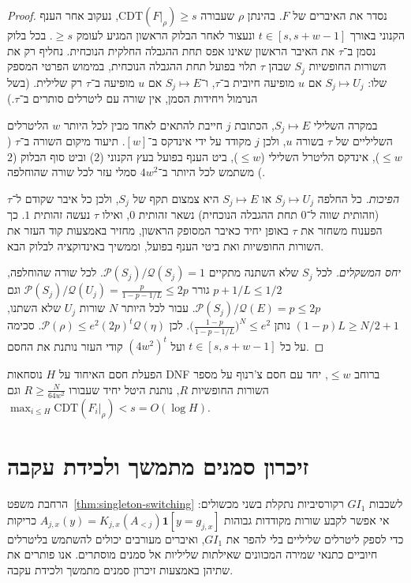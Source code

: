 \documentclass[11pt,a4paper]{article}
\theoremstyle{definition}
\theoremstyle{remark}
\newcommand{\CDT}{\mathrm{CDT}}
\newcommand{\GI}{GI_1}
\newcommand{\EN}[1]{\textenglish{#1}}
\begin{document}
\begin{proof}
נסדר את האיברים של $F$. בהינתן $\rho$ שעבורה $\CDT(F|_\rho) \ge s$, נעקוב אחר הענף הקנוני באורך $t \in [s, s+w-1]$ ונעצור לאחר הבלוק הראשון המגיע לעומק $\ge s$. בכל בלוק נסמן ב־$\tau$ את האיבר הראשון שאינו אפס תחת ההגבלה החלקית הנוכחית. נחליף רק את השורות החופשיות $S_j$ שבהן $\tau$ תלוי בפועל תחת ההגבלה הנוכחית, במימוש הפרטי המספק שלו: $S_j \mapsto U_j$ אם $u$ מופיעה חיובית ב־$\tau$, ו־$S_j \mapsto E$ אם $u$ מופיעה ב־$\tau$ רק שלילית. (בשל הנרמול ויחידות הסמן, אין שורה עם ליטרלים סותרים ב־$\tau$.)

במקרה השלילי $S_j \mapsto E$, הכתובת $j$ חייבת להתאים לאחד מבין לכל היותר $w$ הליטרלים השליליים של $\tau$ בשורה $u$, ולכן $j$ מקודד על ידי אינדקס ב־$[w]$. תיעוד מיקום השורה ב־$\tau$ ($\le w$), אינדקס הליטרל השלילי ($\le w$), ביט הענף בפועל בעץ הקנוני ($2$) וביט סוף הבלוק ($2$) משתמש לכל היותר ב־$4w^2$ סמלי עזר לכל שורה שהוחלפה.

\emph{הפיכות.} כל החלפה $S_j \mapsto U_j$ או $S_j \mapsto E$ היא צמצום תקף של $S_j$, ולכן כל איבר שקודם ל־$\tau$ (וזהותית שווה ל־$0$ תחת ההגבלה הנוכחית) נשאר זהותית $0$, ואילו $\tau$ נעשה זהותית $1$. כך הפענוח משחזר את $\tau$ באופן יחיד כאיבר המסופק הראשון, מחזיר באמצעות קוד העזר את השורות החופשיות ואת ביטי הענף בפועל, וממשיך באינדוקציה לבלוק הבא.

\emph{יחס המשקלים.} לכל $S_j$ שלא השתנה מתקיים $\mathcal{P}(S_j)/\mathcal{Q}(S_j) = 1$. לכל שורה שהוחלפה, $p + 1/L \le 1/2$ גורר $\mathcal{P}(S_j)/\mathcal{Q}(U_j) = \frac{p}{1 - p - 1/L} \le 2p$ וגם $\mathcal{P}(S_j)/\mathcal{Q}(E) = p \le 2p$. עבור לכל היותר $N$ שורות $U_j$ שלא השתנו, $(1-p)L \ge N/2 + 1$ נותן $\bigl(\frac{1-p}{1-p-1/L}\bigr)^N \le e^2$. לכן $\mathcal{P}(\rho) \le e^2 (2p)^t \mathcal{Q}(\eta)$. סכימה על כל $t \in [s, s+w-1]$ ועל $(4w^2)^t$ קודי העזר נותנת את החסם.
\end{proof}

הפעלת חסם האיחוד על $H$ נוסחאות \EN{DNF} ברוחב $\le w$, יחד עם חסם צ'רנוף על מספר השורות החופשיות $R$, נותנת היטל יחיד שעבורו $R \ge \frac{N}{64w^2}$ וגם $\max_{i \le H} \CDT(F_i|_\rho) < s = O(\log H)$.

\section{זיכרון סמנים מתמשך ולכידת עקבה}

הרחבת משפט~\ref{thm:singleton-switching} לשכבות $\GI$ רקורסיביות נתקלת בשני מכשולים: אי אפשר לקבע שורות מקודדות גבוהות $A_{j,x}(y) = K_{j,x}(A_{<j})\mathbf{1}[y = g_{j,x}]$ כריקות כדי לספק ליטרלים שליליים בלי להפר את $\GI$, ואיברים מעורבים יכולים להשתמש בליטרלים חיוביים כתנאי שמירה המכוונים שאילתות שליליות אל סמנים מוסתרים. אנו פותרים את שתיהן באמצעות זיכרון סמנים מתמשך ולכידת עקבה.
\end{document}
